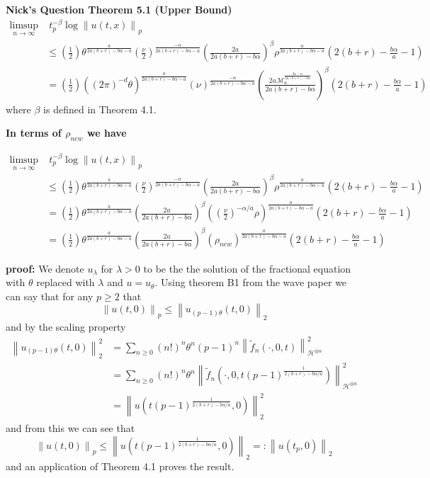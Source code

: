 \documentclass[a4paper,11pt]{article}
\numberwithin{equation}{section}
\theoremstyle{plain}
\theoremstyle{definition}
\newcommand{\Norm}[1]{\left\|  #1   \right\|}
\newcounter{NQ}
\newenvironment{NickQuestion}[1][] %
{\refstepcounter{NQ}
	\begin{mdframed}[backgroundcolor=lightgray]\textbf{Nick's Question \theNQ \: #1~~}~~~\noindent}%
	{\end{mdframed}}
\numberwithin{NQ}{section}
\numberwithin{LQ}{section}
\numberwithin{ZQ}{section}
\begin{document}
	\begin{NickQuestion}[Theorem 5.1 (Upper Bound)]
		\begin{align*}
		\limsup_{n \to \infty}& \; t_p^{-\beta} \log \Norm{u(t,x)}_p
		\\& \le \left(\frac{1}{2}\right) \nonumber \theta^{\frac{a}{2a(b+r)-b\alpha-a}}\left(\frac{\nu}{2}\right)^{\frac{-\alpha}{2a(b+r)-b\alpha -a}}\left( \frac{2a}{2a(b+r)- b\alpha} \right)^\beta \rho^{\frac{a}{2a(b+r)-b\alpha-a}}\left(2(b+r)-\frac{b\alpha}{a}-1\right)
		\\&= \left(\frac{1}{2}\right) \left((2\pi)^{-d}\theta\right)^{\frac{a}{2a(b+r)-b\alpha-a}}\left(\nu\right)^{\frac{-\alpha}{2a(b+r)-b\alpha -a}}\left( \frac{2a \mathcal{M}_a^{\frac{2a-\alpha}{2a(b+r)-b\alpha}} }{2a(b+r)- b\alpha} \right)^\beta \left(2(b+r)-\frac{b\alpha}{a}-1\right)
		\end{align*}
		where $\beta$ is defined in Theorem 4.1.

		\noindent \textbf{In terms of $\rho_{new}$ we have}

		\begin{align*}
		\limsup_{n \to \infty}& \; t_p^{-\beta} \log \Norm{u(t,x)}_p
		\\& \le \left(\frac{1}{2}\right) \nonumber \theta^{\frac{a}{2a(b+r)-b\alpha-a}}\left(\frac{\nu}{2}\right)^{\frac{-\alpha}{2a(b+r)-b\alpha -a}}\left( \frac{2a}{2a(b+r)- b\alpha} \right)^\beta \rho^{\frac{a}{2a(b+r)-b\alpha-a}}\left(2(b+r)-\frac{b\alpha}{a}-1\right)
		\\& = \left(\frac{1}{2}\right) \nonumber \theta^{\frac{a}{2a(b+r)-b\alpha-a}}\left( \frac{2a}{2a(b+r)- b\alpha} \right)^\beta \left(\left(\frac{\nu}{2}\right)^{-\alpha/a}\rho\right)^{\frac{a}{2a(b+r)-b\alpha-a}}\left(2(b+r)-\frac{b\alpha}{a}-1\right)
		\\&=  \left(\frac{1}{2}\right) \nonumber \theta^{\frac{a}{2a(b+r)-b\alpha-a}}\left( \frac{2a}{2a(b+r)- b\alpha} \right)^\beta \left(\rho_{new}\right)^{\frac{a}{2a(b+r)-b\alpha-a}}\left(2(b+r)-\frac{b\alpha}{a}-1\right)
		\end{align*}

		\textbf{proof:} We denote $u_{\lambda}$ for $\lambda >0$ to be the the solution of the fractional equation with $\theta$ replaced with $\lambda$ and $u=u_\theta$. Using theorem B1 from the wave paper we can say that for any $p \ge 2$ that
		\[
		\Norm{u(t,0)}_p \le \Norm{u_{(p-1)\theta}(t,0)}_2
		\]
		and by the scaling property
		\begin{align*}
		\Norm{u_{(p-1)\theta}(t,0)}_2^2 &= \sum_{n \ge 0}(n!)^n\theta^n(p-1)^n \Norm{\tilde{f}_n(\cdot,0,t)}_{\mathcal{H}^{\otimes n}}^2
		\\&= \sum_{n \ge 0}(n!)^n\theta^n \Norm{\tilde{f}_n\left(\cdot,0,t(p-1)^{\frac{1}{2(b+r)-b\alpha/a}}\right)}_{\mathcal{H}^{\otimes n}}^2
		\\&= \Norm{u\left(t(p-1)^{\frac{1}{2(b+r)-b\alpha/a}}, 0\right)}_2^2
		\end{align*}
		and from this we can see that
		\[
		\Norm{u(t,0)}_p \le \Norm{u\left(t(p-1)^{\frac{1}{2(b+r)-b\alpha/a}}, 0\right)}_2 =: \Norm{u(t_p,0)}_2
		\]
		and an application of Theorem 4.1 proves the result.
	\end{NickQuestion}
\end{document}
